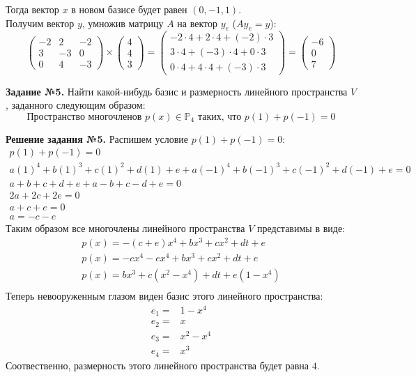 \documentclass[a4paper, 12pt]{article}
\begin{document}
Тогда вектор $x$ в новом базисе будет равен $\left(0, -1, 1 \right)$. \\ 

Получим вектор $y$, умножив матрицу $A$ на вектор $y_e$ ($Ay_e = y$):
\[
\begin{pmatrix}
     -2 & 2 & -2 \\
     3 & -3 & 0 \\
     0 & 4 & -3 
\end{pmatrix}
\times
\begin{pmatrix}
     4 \\
     4 \\
     3 
\end{pmatrix} = 
\begin{pmatrix}
    -2\cdot4+2\cdot4+\left(-2\right)\cdot3 \\
    3\cdot4+\left(-3\right)\cdot4+0\cdot3 \\
    0\cdot4+4\cdot4+\left(-3\right)\cdot3
\end{pmatrix} = 
\begin{pmatrix}
     -6 \\
     0 \\
     7 
\end{pmatrix}
\]


\vspace{1cm}

\textbf{Задание №5.} Найти какой-нибудь базис и размерность линейного пространства $V$, заданного следующим образом: 
\[
\text{Пространство многочленов $p(x) \in \mathbb{P}_4$ таких, что $p(1) + p(-1) = 0$}
\]

\vspace{0.5cm} 

\textbf{Решение задания №5.} Распишем условие $p(1) + p(-1) = 0$:
\begin{gather*}
    p(1) + p(-1) = 0 \\ 
    a(1)^4 + b(1)^3 + c(1)^2 + d(1) + e + a(-1)^4 + b(-1)^3 + c(-1)^2 + d(-1) + e = 0 \\ 
    a + b + c + d + e + a - b + c - d + e = 0 \\
    2a + 2c + 2e = 0 \\
    a + c + e = 0 \\
    a = -c - e 
\end{gather*}
Таким образом все многочлены линейного пространства $V$ представимы в виде:
\begin{gather*}
    p(x) = -(c + e)x^4 + bx^3 + cx^2 + dt + e \\ 
    p(x) = -cx^4 - ex^4 + bx^3 + cx^2 + dt + e \\ 
    p(x) = bx^3 + c(x^2 - x^4)+ dt + e(1 - x^4) \\ 
\end{gather*}
Теперь невооруженным глазом виден базис этого линейного пространства:
\begin{align*}
    e_1 = & 1 - x^4 \\ 
    e_2 = & x \\ 
    e_3 = & x^2 - x^4 \\ 
    e_4 = & x^3 
\end{align*}
Соотвественно, размерность этого линейного пространства будет равна $4$.
\end{document}
